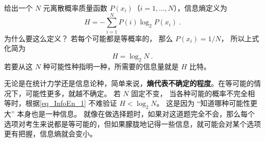 
\begin{issues}
\issueDraft
\end{issues}

给出一个 $N$ 元离散概率质量函数 $P(x_i)$（$i=1,\dots,N$），信息熵定义为
\begin{equation}\label{eq_InfoEn_1}
H = -\sum_{i=1}^N P(i) \log_2 P(x_i)~.
\end{equation}
为什么要这么定义？ 若每个可能都是等概率的， 那么 $P(x_i) = 1/N$， 所以上式化简为
\begin{equation}
H = \log_2 N~.
\end{equation}
若要从这 $N$ 种可能性种指明一种，所需要的信息量就是 $H$ 比特。

无论是在统计力学还是信息论种，简单来说，\textbf{熵代表不确定的程度}。在等可能的情况下，可能性更多，就越不确定。 若 $N$ 固定不变， 当各种可能的概率不完全相等时，根据\autoref{eq_InfoEn_1} 不难验证 $H < \log_2 N$。 这是因为 “知道哪种可能性更大” 本身也是一种信息。 就像在做选择题时，如果对这道题完全不会，那么每个选项对考生来说都是等可能的，但如果朦胧地记得一些信息，就可能会对某个选项更有把握，信息熵就会变小。
